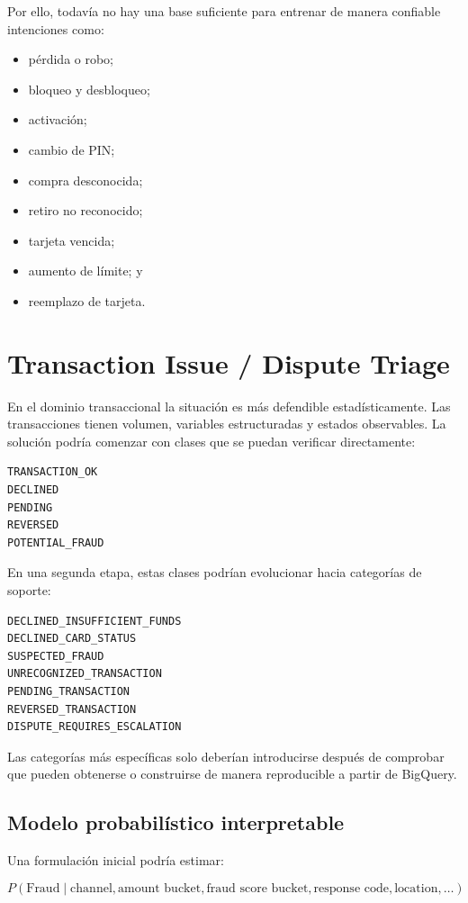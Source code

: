 \documentclass[11pt,a4paper]{article}
\begin{document}
Por ello, todavía no hay una base suficiente para entrenar de manera confiable intenciones como:

\begin{itemize}
  \item pérdida o robo;
  \item bloqueo y desbloqueo;
  \item activación;
  \item cambio de PIN;
  \item compra desconocida;
  \item retiro no reconocido;
  \item tarjeta vencida;
  \item aumento de límite; y
  \item reemplazo de tarjeta.
\end{itemize}

\section{Transaction Issue / Dispute Triage}

En el dominio transaccional la situación es más defendible estadísticamente. Las transacciones tienen volumen, variables estructuradas y estados observables. La solución podría comenzar con clases que se puedan verificar directamente:

\begin{lstlisting}
TRANSACTION_OK
DECLINED
PENDING
REVERSED
POTENTIAL_FRAUD
\end{lstlisting}

En una segunda etapa, estas clases podrían evolucionar hacia categorías de soporte:

\begin{lstlisting}
DECLINED_INSUFFICIENT_FUNDS
DECLINED_CARD_STATUS
SUSPECTED_FRAUD
UNRECOGNIZED_TRANSACTION
PENDING_TRANSACTION
REVERSED_TRANSACTION
DISPUTE_REQUIRES_ESCALATION
\end{lstlisting}

Las categorías más específicas solo deberían introducirse después de comprobar que pueden obtenerse o construirse de manera reproducible a partir de BigQuery.

\subsection{Modelo probabilístico interpretable}

Una formulación inicial podría estimar:

\[
P(\text{Fraud}\mid \text{channel},\text{amount bucket},\text{fraud score bucket},\text{response code},\text{location},\ldots)
\]
\end{document}
